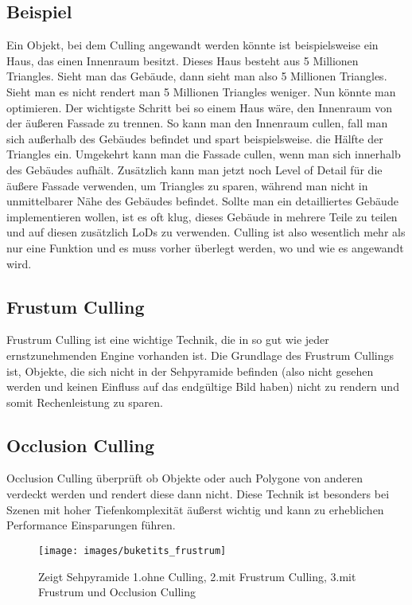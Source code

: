 \subsection{Beispiel}
Ein Objekt, bei dem Culling angewandt werden könnte ist beispielsweise ein Haus, das einen Innenraum besitzt. Dieses Haus besteht aus 5 Millionen Triangles. Sieht man das Gebäude, dann sieht man also 5 Millionen Triangles. Sieht man es nicht rendert man 5 Millionen Triangles weniger. Nun könnte man optimieren.
Der wichtigste Schritt bei so einem Haus wäre, den Innenraum von der äußeren Fassade zu trennen. So kann man den Innenraum cullen, fall man sich außerhalb des Gebäudes befindet und spart beispielsweise. die Hälfte der Triangles ein. Umgekehrt kann man die Fassade cullen, wenn man sich innerhalb des Gebäudes aufhält.
Zusätzlich kann man jetzt noch Level of Detail für die äußere Fassade verwenden, um Triangles zu sparen, während man nicht in unmittelbarer Nähe des Gebäudes befindet. Sollte man ein detailliertes Gebäude implementieren wollen, ist es oft klug, dieses Gebäude in mehrere Teile zu teilen und auf diesen zusätzlich LoDs zu verwenden. Culling ist also wesentlich mehr als nur eine Funktion und es muss vorher überlegt werden, wo und wie es angewandt wird.

\cite{_cryengine_culling}

\subsection{Frustum Culling}
Frustrum Culling ist eine wichtige Technik, die in so gut wie jeder ernstzunehmenden Engine vorhanden ist. Die Grundlage des Frustrum Cullings ist, Objekte, die sich nicht in der Sehpyramide befinden (also nicht gesehen werden und keinen Einfluss auf das endgültige Bild haben) nicht zu rendern und somit Rechenleistung zu sparen.
\cite{_cryengine_culling}

\subsection{Occlusion Culling}
Occlusion Culling überprüft ob Objekte oder auch Polygone von anderen verdeckt werden und rendert diese dann nicht. Diese Technik ist besonders bei Szenen mit hoher Tiefenkomplexität äußerst wichtig und kann zu erheblichen Performance Einsparungen führen.
\cite{_cryengine_culling}

\begin{figure}[H]
	\centering
	\texttt{[image: images/buketits\_frustrum]}
	\caption{Zeigt Sehpyramide 1.ohne Culling, 2.mit Frustrum Culling, 3.mit Frustrum und Occlusion Culling\cite{_culling}}
\end{figure}

